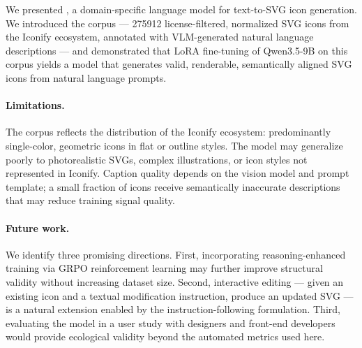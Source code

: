 

We presented \method{}, a domain-specific language model for text-to-SVG icon
generation. We introduced the \dataset{} corpus --- \num{275912} license-filtered,
normalized SVG icons from the Iconify ecosystem, annotated with VLM-generated
natural language descriptions --- and demonstrated that LoRA fine-tuning of
Qwen3.5-9B on this corpus yields a model that generates valid, renderable,
semantically aligned SVG icons from natural language prompts.


\paragraph{Limitations.}
The \dataset{} corpus reflects the distribution of the Iconify ecosystem:
predominantly single-color, geometric icons in flat or outline styles. The
model may generalize poorly to photorealistic SVGs, complex illustrations,
or icon styles not represented in Iconify. Caption quality depends on the
vision model and prompt template; a small fraction of icons receive semantically
inaccurate descriptions that may reduce training signal quality.

\paragraph{Future work.}
We identify three promising directions. First, incorporating reasoning-enhanced
training \citep{svgen2025, reason_svg2025} via GRPO reinforcement learning may
further improve structural validity without increasing dataset size. Second,
interactive editing --- given an existing icon and a textual modification
instruction, produce an updated SVG --- is a natural extension enabled by the
instruction-following formulation. Third, evaluating the model in a
user study with designers and front-end developers would provide ecological
validity beyond the automated metrics used here.
